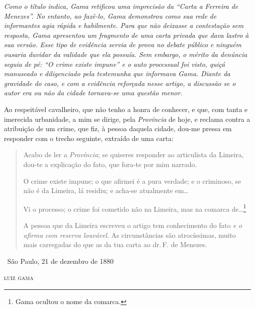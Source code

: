 {\begin{resumo}
\emph{Como o título indica, Gama retificou uma imprecisão da ``Carta a
Ferreira de Menezes''. No entanto, ao fazê-lo, Gama demonstrou como
sua rede de informantes agia rápida e habilmente. Para que não deixasse
a contestação sem resposta, Gama apresentou um fragmento de uma carta
privada que dava lastro à sua versão. Esse tipo de evidência servia de
prova no debate público e ninguém ousaria duvidar da validade que ela
possuía. Sem embargo, o mérito da denúncia seguia de pé: ``O crime existe
impune'' e o auto processual foi visto, quiçá manuseado e diligenciado
pela testemunha que informava Gama. Diante da gravidade do caso, e com a
evidência reforçada nesse artigo, a discussão se o autor era ou não da
cidade tornava-se uma questão menor. }
\end{resumo}

Ao respeitável cavalheiro, que não tenho a honra de conhecer, e que, com
tanta e imerecida urbanidade, a mim se dirige, pela \emph{Província} de
hoje, e reclama contra a atribuição de um crime, que fiz, à pessoa
daquela cidade, dou-me pressa em responder com o trecho seguinte,
extraído de uma carta:

\noindent\dotfill{}

\begin{quote}
Acabo de ler a \emph{Província}; se quiseres responder ao articulista
da Limeira, dou-te a explicação do fato, que fora-te por mim narrado.

O crime existe impune; o que afirmei é a pura verdade; e o criminoso, se
não é da Limeira, lá residiu; e acha-se atualmente em\ldots{}

Vi o processo; o crime foi cometido não na Limeira, mas na comarca
de\ldots{}\footnote{Gama ocultou o nome da comarca.}

A pessoa que da Limeira
escreveu o artigo tem conhecimento do fato \emph{e o afirma com reserva
louvável}. As circunstâncias são atrocíssimas, muito mais carregadas do
que as da tua carta ao dr.\,F. de Menezes.
\end{quote}

\noindent\dotfill\medskip

\hfill\ São Paulo, 21 de dezembro de 1880

\hfill\textsc{luiz gama}


}
